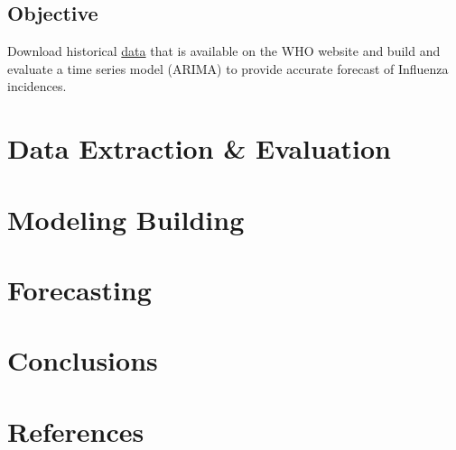 \documentclass[
]{article}
\begin{document}
\hypertarget{objective}{%
\subsection{Objective}\label{objective}}

Download historical
\href{https://apps.who.int/flumart/Default?ReportNo=12}{data} that is
available on the WHO website and build and evaluate a time series model
(ARIMA) to provide accurate forecast of Influenza incidences.

\newpage

\hypertarget{data-extraction-evaluation}{%
\section{Data Extraction \&
Evaluation}\label{data-extraction-evaluation}}

\newpage

\hypertarget{modeling-building}{%
\section{Modeling Building}\label{modeling-building}}

\newpage

\hypertarget{forecasting}{%
\section{Forecasting}\label{forecasting}}

\newpage

\hypertarget{conclusions}{%
\section{Conclusions}\label{conclusions}}

\newpage

\hypertarget{references}{%
\section{References}\label{references}}
\end{document}
